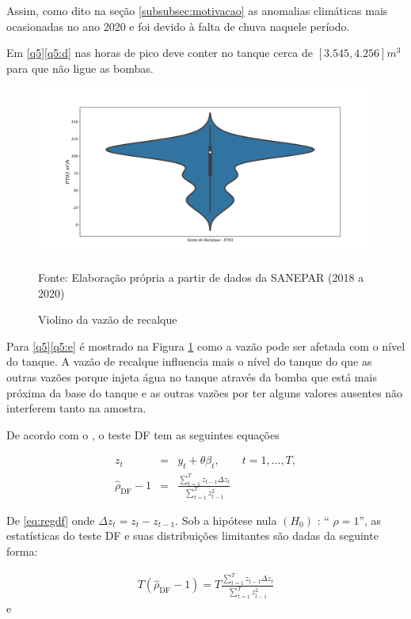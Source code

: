 \begin{itemize}
	Assim, como dito na seção \ref{subsubsec:motivacao} as anomalias climáticas mais ocasionadas no ano 2020 e foi devido à falta de chuva naquele período.
	
	Em \ref{q5}\ref{q5:d} nas horas de pico deve conter no tanque cerca de $[3.545,4.256] m^3$ para que não ligue as bombas.
	
	
	\begin{figure}[H]
		\centering
		\caption{Violino da vazão de recalque}
		\label{fig:ft03}
		\includegraphics[width=0.9\linewidth]{Resultados/Figuras/ft03}
		
		Fonte: Elaboração própria a partir de dados da SANEPAR (2018 a 2020)
	\end{figure}
	
	Para \ref{q5}\ref{q5:e} é mostrado na Figura \ref{fig:ft03} como a vazão pode ser afetada com o nível do tanque. A vazão de recalque influencia mais o nível do tanque do que as outras vazões porque injeta água no tanque através da bomba que está mais próxima da base do tanque e as outras vazões por ter alguns valores ausentes não interferem tanto na amostra.
	
	
\end{itemize}

De acordo com o , o teste DF tem as seguintes equações

\begin{eqnarray}
	z_t&=& y_t+\theta \beta_t, \qquad t=1,\ldots, T, \label{eq:df3}\\	
	\hat{\rho}_{\mathrm{DF}}-1&=&\frac{\sum_{t=1}^T z_{t-1} \Delta z_t}{\sum_{t=1}^T z_{t-1}^2} \label{eq:regdf}
\end{eqnarray}

De \eqref{eq:regdf} onde $\Delta z_t=z_t-z_{t-1}$. Sob a hipótese nula $\left(H_0\right)$ : `` $\rho=1$'', as estatísticas do teste DF e suas distribuições limitantes são dadas da seguinte forma:


\begin{eqnarray}
	T\left(\hat{\rho}_{\mathrm{DF}}-1\right)=T \frac{\sum_{t=1}^T z_{t-1} \Delta z_t}{\sum_{t=1}^T z_{t-1}^2}
\end{eqnarray}
e


